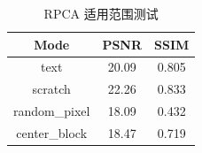 \begin{table}[htbp]
\centering
\caption{RPCA 适用范围测试}
\label{tab:chapter4_rpca}
\small
\begin{tabular}{|c|c|c|}
\hline
Mode & PSNR & SSIM \\
\hline
text & 20.09 & 0.805 \\
scratch & 22.26 & 0.833 \\
random_pixel & 18.09 & 0.432 \\
center_block & 18.47 & 0.719 \\
\hline
\end{tabular}
\end{table}
